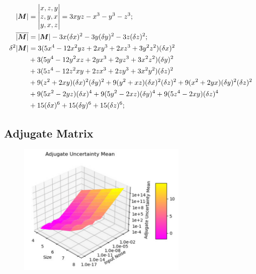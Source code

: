 \documentclass[twoside]{article}
\numberwithin{equation}{section}
\begin{document}
\begin{align}
\label{eqn: special determinant}
|\protect{\textrm{\boldmath $M$}}| &= \left| \begin{matrix} x, z, y \\ z, y, x \\ y, x, z \end{matrix} \right| = 3 x y z - x^3 - y^3 - z^3; \\
\label{eqn: special determinant mean}
\overline{|\protect{\textrm{\boldmath $M$}}|} &= |\protect{\textrm{\boldmath $M$}}| - 3 x (\delta x)^2 - 3 y (\delta y)^2 - 3 z (\delta z)^2; \\
\label{eqn: special determinant variance}
\delta^2 |\protect{\textrm{\boldmath $M$}}| &= 3 (5 x^4 - 12 x^2 y z + 2 x y^3 + 2 x z^3 + 3 y^2 z^2)(\delta x)^2 \\
 	&+ 3 (5 y^4 - 12 y^2 x z + 2 y x^3 + 2 y z^3 + 3 x^2 z^2)(\delta y)^2 \nonumber \\
 	&+ 3 (5 z^4 - 12 z^2 x y + 2 z x^3 + 2 z y^3 + 3 x^2 y^2)(\delta z)^2 \nonumber \\
 	&+ 9 (z^2 + 2 x y)(\delta x)^2 (\delta y)^2 + 9 (y^2 + x z) (\delta x)^2 (\delta z)^2 + 9 (x^2 +2 y x) (\delta y)^2 (\delta z)^2 \nonumber \\
 	&+ 9 (5 x^2 - 2 y z) (\delta x)^4 + 9 (5 y^2 - 2 x z) (\delta y)^4 + 9 (5z^4 - 2 x y) (\delta z)^4 \nonumber \\
    &+ 15 (\delta x)^6 + 15 (\delta y)^6 + 15 (\delta z)^6 \nonumber;
\end{align}




\subsection{Adjugate Matrix}

\begin{figure}[p]
\centering
\includegraphics[height=2.5in]{Adjugate_Uncertainty_vs_Size_Noise.pdf} 
\label{fig: Adjugate_Uncertainty_vs_Size_Noise}
\end{figure}
\end{document}
